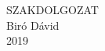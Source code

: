 \newpage
{
    \begin{center}
    \vspace*{5cm}
    {
        \Huge SZAKDOLGOZAT}\\
        \vspace*{10cm}
        {\LARGE Biró Dávid}\\
        \vspace*{3cm}
        {\LARGE 2019}
    \end{center}
}
\pagebreak